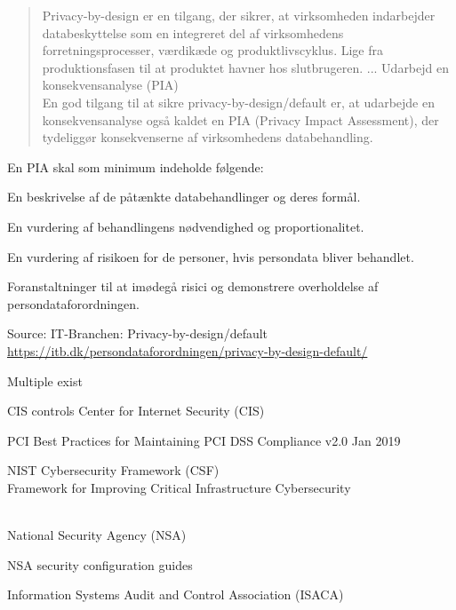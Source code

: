 \documentclass[Screen16to9,17pt]{foils}
\begin{document}

\begin{quote}\small
Privacy-by-design er en tilgang, der sikrer, at virksomheden indarbejder databeskyttelse som en integreret del af virksomhedens forretningsprocesser, værdikæde og produktlivscyklus. Lige fra produktionsfasen til at produktet havner hos slutbrugeren.
...
Udarbejd en konsekvensanalyse (PIA)\\
En god tilgang til at sikre privacy-by-design/default er, at udarbejde en konsekvensanalyse også kaldet en PIA (Privacy Impact Assessment), der tydeliggør konsekvenserne af virksomhedens databehandling.
\end{quote}

En PIA skal som minimum indeholde følgende:

\begin{list2}
\item En beskrivelse af de påtænkte databehandlinger og deres formål.
\item En vurdering af behandlingens nødvendighed og proportionalitet.
\item En vurdering af risikoen for de personer, hvis persondata bliver behandlet.
\item Foranstaltninger til at imødegå risici og demonstrere overholdelse af persondataforordningen.
\end{list2}

Source: IT-Branchen: Privacy-by-design/default\\ \url{https://itb.dk/persondataforordningen/privacy-by-design-default/}



\begin{list1}
\item Multiple exist
\vskip 1cm
\begin{list2}
\item CIS controls Center for Internet Security (CIS) 
\item PCI Best Practices for Maintaining PCI DSS Compliance v2.0 Jan 2019
\item NIST Cybersecurity Framework (CSF)\\
Framework for Improving
Critical Infrastructure Cybersecurity\\ \\
\item National Security Agency (NSA)\\ 
\item NSA security configuration guides\\ 
\item Information Systems Audit and Control Association (ISACA)\\
\end{list2}
\end{list1}
\end{document}
